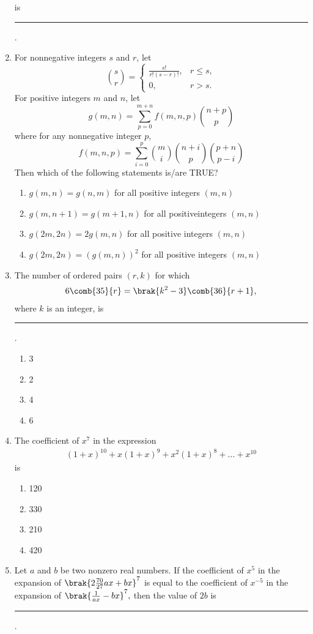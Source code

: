 \begin{enumerate}[label=\thesubsection.\arabic*,ref=\thesubsection.\theenumi]
	is \rule{1cm}{0.1pt}.
\hfill {}
\item For nonnegative integers $s$ and $r$, let 
$$\binom{s}{r} =
\begin{cases}
\frac{s!}{r!(s - r)!},& r \leq s,\\ 0, &  r > s.
\end{cases}$$
For positive integers $m$ and $n$, let 
	  $$g(m, n) = \sum_{p=0}^{m+n} f(m, n, p) \binom{n + p}{p}$$
where for any nonnegative integer $p$,
       $$ f(m, n, p) = \sum_{i=0}^{p} \binom{m}{i} \binom{n + i}{p} \binom{p + n}{p - i}$$
Then which of the following statements is/are TRUE?
\hfill {}
\begin{enumerate}
\item $ g(m, n) = g(n, m) $ for all positive integers $( m, n )$
\item $ g(m, n + 1) = g(m + 1, n) $ for all positiveintegers $( m, n )$  
\item $ g(2m, 2n) = 2 g(m, n) $ for all positive integers $( m, n )$  
\item $ g(2m, 2n) = (g(m, n))^2 $ for all positive integers $( m, n )$
\end{enumerate}
\item The number of ordered pairs $(r, k)$ for which \begin{align*}6\comb{35}{r} = \brak{k^2 - 3}\comb{36}{r+1}, \end{align*}where $k$ is an integer, is
\rule{1cm}{0.1pt}.
\hfill {}
\begin{multicols}{4}
\begin{enumerate}
   \item 3
   \item 2
   \item 4
   \item 6
\end{enumerate}
\end{multicols}
\item The coefficient of $x^7$ in the expression\begin{align*}(1 + x)^{10} + x (1 + x)^9 + x^2 (1 + x)^8 + \dots + x^{10} \end{align*}is
\hfill{}
\begin{multicols}{4}
\begin{enumerate}  
   \item  120
   \item  330
   \item  210
   \item  420
\end{enumerate}
\end{multicols}
\item Let $ a $ and $ b $ be two nonzero real numbers. If the coefficient of $ x^5 $ in the expansion of 
$
\brak{ 2 \frac{70}{27} ax + bx}^7
$
is equal to the coefficient of $ x^{-5} $ in the expansion of 
$
\brak{ \frac{1}{ax} - bx}^7,
$
then the value of $ 2b $ is 
\rule{1cm}{0.1pt}.
\hfill{}
\end{enumerate}

